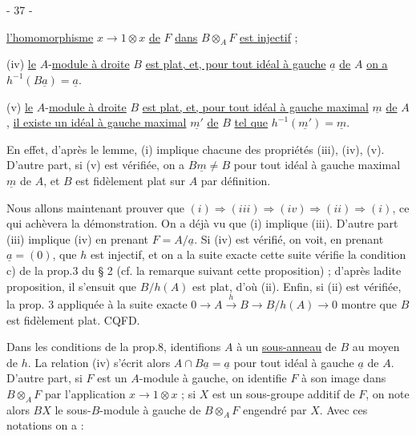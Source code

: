 
\begin{center}- 37 -\end{center}
\uline{l'homomorphisme} $x\longrightarrow1\otimes x$ \uline{de} $F$ \uline{dans} $B\otimes_A F$ \uline{est injectif} ;

(iv) \uline{le} $A$-\uline{module à droite} $B$ \uline{est plat, et, pour tout idéal à gauche} $\underline a$ \uline{de} $A$ \uline{on a} $h^{-1}(B\underline a)=\underline a$.

(v) \uline{le} $A$-\uline{module à droite} $B$ \uline{est plat, et, pour tout idéal à gauche maximal} $\underline m$ \uline{de} $A$, \uline{il existe un idéal à gauche maximal} $\underline{m'}$ \uline{de} $B$ \uline{tel que} $h^{-1}(\underline{m'})=\underline m$.

En effet, d'après le lemme, (i) implique chacune des propriétés (iii), (iv), (v). D'autre part, si (v) est vérifiée, on a $B\underline m\ne B$ pour tout idéal à gauche maximal $\underline m$ de $A$, et $B$ est fidèlement plat sur $A$ par définition.

Nous allons maintenant prouver que $(i)\Longrightarrow(iii)\Longrightarrow(iv)\Longrightarrow(ii)\Longrightarrow(i)$, ce qui achèvera la démonstration. On a déjà vu que (i) implique (iii). D'autre part (iii) implique (iv) en prenant $F=A/\underline a$. Si (iv) est vérifié, on voit, en prenant $\underline a=(0)$, que $h$ est injectif, et on a la suite exacte
cette suite vérifie la condition c) de la prop.3 du § 2 (cf. la remarque suivant cette proposition) ; d'après ladite proposition, il s'ensuit que $B/h(A)$ est plat, d'où (ii). Enfin, si (ii) est vérifiée, la prop. 3 appliquée à la suite exacte $0\longrightarrow A\xrightarrow{h}B\longrightarrow B/h(A)\longrightarrow0$ montre que $B$ est fidèlement plat. CQFD.

Dans les conditions de la prop.8, identifions $A$ à un \uline{sous-anneau} de $B$ au moyen de $h$. La relation (iv) s'écrit alors $A\cap B\underline a=\underline a$ pour tout idéal à gauche $\underline a$ de $A$. D'autre part, si $F$ est un $A$-module à gauche, on identifie $F$ à son image dans $B\otimes_A F$ par l'application $x\longrightarrow1\otimes x$ ; si $X$ est un sous-groupe additif de $F$, on note alors $BX$ le sous-$B$-module à gauche de $B\otimes_A F$ engendré par $X$. Avec ces notations on a :

